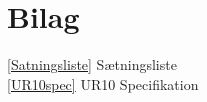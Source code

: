 \chapter{Bilag}\label{Bilag}

\ref{Satningsliste} Sætningsliste \\
\ref{UR10spec} UR10 Specifikation \\

